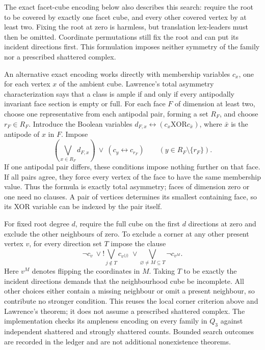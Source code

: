 \documentclass[11pt]{article}
\numberwithin{equation}{section}
\theoremstyle{definition}
\theoremstyle{remark}
\begin{document}
The exact facet-cube encoding below also describes this search: require
the root to be covered by exactly one facet cube, and every other
covered vertex by at least two. Fixing the root at zero is harmless,
but translation lex-leaders must then be omitted. Coordinate permutations
still fix the root and can put its incident directions first. This
formulation imposes neither symmetry of the family nor a prescribed
shattered complex.

An alternative exact encoding works directly with membership variables
$c_x$, one for each vertex $x$ of the ambient cube. Lawrence's total
asymmetry characterization \cite[Theorems~3--4]{Lawrence83} says that a
class is ample if and only if every antipodally invariant face section
is empty or full. For each face $F$ of dimension at least two, choose
one representative from each antipodal pair, forming a set $R_F$, and
choose $r_F\in R_F$. Introduce the Boolean variables
$d_{F,x}\leftrightarrow(c_x\mathbin{\mathrm{XOR}}c_{\bar x})$, where
$\bar x$ is the antipode of $x$ in $F$. Impose
\[
 \left(\bigvee_{x\in R_F}d_{F,x}\right)
 \ \lor\ (c_y\leftrightarrow c_{r_F})
 \qquad (y\in R_F\setminus\{r_F\}).
\]
If one antipodal pair differs, these conditions impose nothing further
on that face. If all pairs agree, they force every vertex of the face
to have the same membership value. Thus the formula is exactly total
asymmetry; faces of dimension zero or one need no clauses. A pair of
vertices determines its smallest containing face, so its XOR variable
can be indexed by the pair itself.

For fixed root degree $d$, require the full cube on the first $d$
directions at zero and exclude the other neighbours of zero. To exclude
a corner at any other present vertex $v$, for every direction set $T$
impose the clause
\[
 \neg c_v\ \lor\!!\bigvee_{j\notin T}c_{v^{\{j\}}}
 \ \lor\!\!\bigvee_{\varnothing\ne M\subseteq T}\neg c_{v^M}.
\]
Here $v^M$ denotes flipping the coordinates in $M$. Taking $T$ to be
exactly the incident directions demands that the neighbourhood cube
be incomplete. All other choices either contain a missing neighbour
or omit a present neighbour, so contribute no stronger condition.
This reuses the local corner criterion above and Lawrence's theorem;
it does not assume a prescribed shattered complex. The implementation
 checks its ampleness
encoding on every family in $Q_3$ against independent shattered and
strongly shattered counts. Bounded search outcomes are recorded in
the ledger and are not additional nonexistence theorems.
\end{document}
